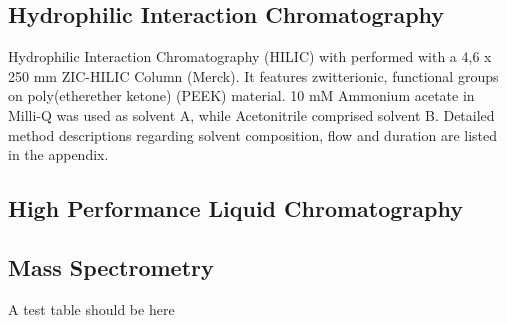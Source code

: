 	\subsection{Hydrophilic Interaction Chromatography} %
	\label{sub:hilic}

	Hydrophilic Interaction Chromatography (HILIC) with performed with a 4,6 x 250 mm ZIC-HILIC Column (Merck). It features zwitterionic, functional groups on poly(etherether ketone) (PEEK) material.
	10 mM Ammonium acetate in Milli-Q  was used as solvent A, while Acetonitrile comprised solvent B. Detailed method descriptions regarding solvent composition, flow and duration are listed in the appendix.

	\subsection{High Performance Liquid Chromatography} %
	\label{sub:hplc}

	\subsection{Mass Spectrometry} %
	\label{sub:mass_spectrometry}

A test table should be here


